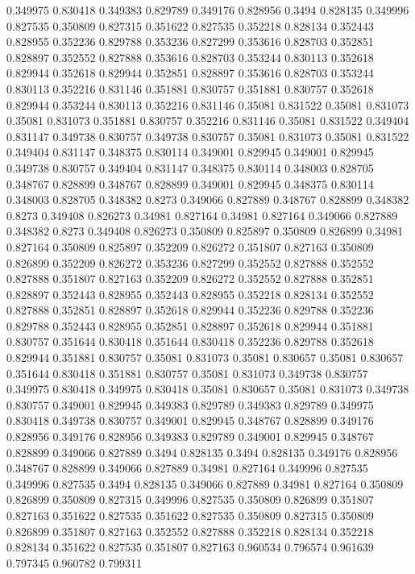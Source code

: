 0.349975 0.830418
0.349383 0.829789
0.349176 0.828956
0.3494 0.828135
0.349996 0.827535
0.350809 0.827315
0.351622 0.827535
0.352218 0.828134
0.352443 0.828955
0.352236 0.829788
0.353236 0.827299
0.353616 0.828703
0.352851 0.828897
0.352552 0.827888
0.353616 0.828703
0.353244 0.830113
0.352618 0.829944
0.352618 0.829944
0.352851 0.828897
0.353616 0.828703
0.353244 0.830113
0.352216 0.831146
0.351881 0.830757
0.351881 0.830757
0.352618 0.829944
0.353244 0.830113
0.352216 0.831146
0.35081 0.831522
0.35081 0.831073
0.35081 0.831073
0.351881 0.830757
0.352216 0.831146
0.35081 0.831522
0.349404 0.831147
0.349738 0.830757
0.349738 0.830757
0.35081 0.831073
0.35081 0.831522
0.349404 0.831147
0.348375 0.830114
0.349001 0.829945
0.349001 0.829945
0.349738 0.830757
0.349404 0.831147
0.348375 0.830114
0.348003 0.828705
0.348767 0.828899
0.348767 0.828899
0.349001 0.829945
0.348375 0.830114
0.348003 0.828705
0.348382 0.8273
0.349066 0.827889
0.348767 0.828899
0.348382 0.8273
0.349408 0.826273
0.34981 0.827164
0.34981 0.827164
0.349066 0.827889
0.348382 0.8273
0.349408 0.826273
0.350809 0.825897
0.350809 0.826899
0.34981 0.827164
0.350809 0.825897
0.352209 0.826272
0.351807 0.827163
0.350809 0.826899
0.352209 0.826272
0.353236 0.827299
0.352552 0.827888
0.352552 0.827888
0.351807 0.827163
0.352209 0.826272
0.352552 0.827888
0.352851 0.828897
0.352443 0.828955
0.352443 0.828955
0.352218 0.828134
0.352552 0.827888
0.352851 0.828897
0.352618 0.829944
0.352236 0.829788
0.352236 0.829788
0.352443 0.828955
0.352851 0.828897
0.352618 0.829944
0.351881 0.830757
0.351644 0.830418
0.351644 0.830418
0.352236 0.829788
0.352618 0.829944
0.351881 0.830757
0.35081 0.831073
0.35081 0.830657
0.35081 0.830657
0.351644 0.830418
0.351881 0.830757
0.35081 0.831073
0.349738 0.830757
0.349975 0.830418
0.349975 0.830418
0.35081 0.830657
0.35081 0.831073
0.349738 0.830757
0.349001 0.829945
0.349383 0.829789
0.349383 0.829789
0.349975 0.830418
0.349738 0.830757
0.349001 0.829945
0.348767 0.828899
0.349176 0.828956
0.349176 0.828956
0.349383 0.829789
0.349001 0.829945
0.348767 0.828899
0.349066 0.827889
0.3494 0.828135
0.3494 0.828135
0.349176 0.828956
0.348767 0.828899
0.349066 0.827889
0.34981 0.827164
0.349996 0.827535
0.349996 0.827535
0.3494 0.828135
0.349066 0.827889
0.34981 0.827164
0.350809 0.826899
0.350809 0.827315
0.349996 0.827535
0.350809 0.826899
0.351807 0.827163
0.351622 0.827535
0.351622 0.827535
0.350809 0.827315
0.350809 0.826899
0.351807 0.827163
0.352552 0.827888
0.352218 0.828134
0.352218 0.828134
0.351622 0.827535
0.351807 0.827163
0.960534 0.796574
0.961639 0.797345
0.960782 0.799311
